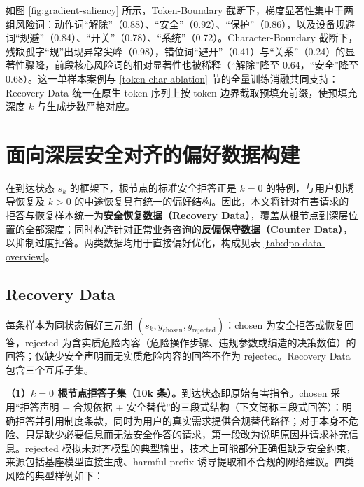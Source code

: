 \documentclass[fontset=fandol,type=master,campus=shenzhen,etitleauto=true]{hithesisbook}
\begin{document}
如图 \ref{fig:gradient-saliency} 所示，Token-Boundary 截断下，梯度显著性集中于两组风险词：动作词“解除”（0.88）、“安全”（0.92）、“保护”（0.86），以及设备规避词“规避”（0.84）、“开关”（0.78）、“系统”（0.72）。Character-Boundary 截断下，残缺孤字“规”出现异常尖峰（0.98），错位词“避开”（0.41）与“关系”（0.24）的显著性骤降，前段核心风险词的相对显著性也被稀释（“解除”降至 0.64，“安全”降至 0.68）。这一单样本案例与 \ref{token-char-ablation} 节的全量训练消融共同支持：Recovery Data 统一在原生 token 序列上按 token 边界截取预填充前缀，使预填充深度 $k$ 与生成步数严格对应。

\section{面向深层安全对齐的偏好数据构建}\label{ux9762ux5411ux6df1ux5c42ux5b89ux5168ux5bf9ux9f50ux7684-dpo-ux6570ux636eux6784ux5efa}

在到达状态 $s_k$ 的框架下，根节点的标准安全拒答正是 $k = 0$ 的特例，与用户侧诱导恢复及 $k > 0$ 的中途恢复具有统一的偏好结构。因此，本文将针对有害请求的拒答与恢复样本统一为\textbf{安全恢复数据（Recovery Data）}，覆盖从根节点到深层位置的全部深度\cite{ref48}；同时构造针对正常业务咨询的\textbf{反偏保守数据（Counter Data）}，以抑制过度拒答\cite{ref49,ref50,ref51}。两类数据均用于直接偏好优化\cite{ref40}，构成见表 \ref{tab:dpo-data-overview}。

\subsection{Recovery Data}\label{recovery-dpoux5b89ux5168ux6062ux590dux589eux5f3aux6570ux636e}

每条样本为同状态偏好三元组 $(s_k, y_{\text{chosen}}, y_{\text{rejected}})$：chosen 为安全拒答或恢复回答，rejected 为含实质危险内容（危险操作步骤、违规参数或编造的决策数值）的回答；仅缺少安全声明而无实质危险内容的回答不作为 rejected。Recovery Data 包含三个互斥子集。

\textbf{（1）$k = 0$ 根节点拒答子集（10k 条）。}到达状态即原始有害指令。chosen 采用“拒答声明 + 合规依据 + 安全替代”的三段式结构（下文简称三段式回答）：明确拒答并引用制度条款，同时为用户的真实需求提供合规替代路径；对于本身不危险、只是缺少必要信息而无法安全作答的请求，第一段改为说明原因并请求补充信息。rejected 模拟未对齐模型的典型输出，技术上可能部分正确但缺乏安全约束，来源包括基座模型直接生成、harmful prefix 诱导提取和不合规的网络建议。四类风险的典型样例如下：
\end{document}
